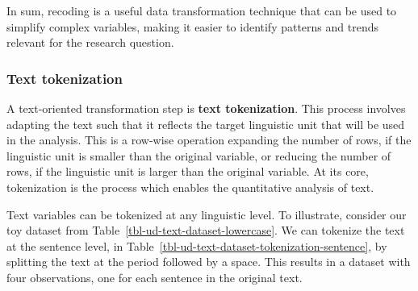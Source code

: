 \documentclass[
  letterpaper,
  DIV=11,
  numbers=noendperiod]{scrreport}
\theoremstyle{definition}
\theoremstyle{remark}
\begin{document}
In sum, recoding is a useful data transformation technique that can be
used to simplify complex variables, making it easier to identify
patterns and trends relevant for the research question.

\hypertarget{sec-ud-text-tokenization}{%
\subsubsection{Text tokenization}\label{sec-ud-text-tokenization}}

A text-oriented transformation step is \textbf{text tokenization}. This
process involves adapting the text such that it reflects the target
linguistic unit that will be used in the analysis. This is a row-wise
operation expanding the number of rows, if the linguistic unit is
smaller than the original variable, or reducing the number of rows, if
the linguistic unit is larger than the original variable. At its core,
tokenization is the process which enables the quantitative analysis of
text.

Text variables can be tokenized at any linguistic level. To illustrate,
consider our toy dataset from Table~\ref{tbl-ud-text-dataset-lowercase}.
We can tokenize the text at the sentence level, in
Table~\ref{tbl-ud-text-dataset-tokenization-sentence}, by splitting the
text at the period followed by a space. This results in a dataset with
four observations, one for each sentence in the original text.
\end{document}
